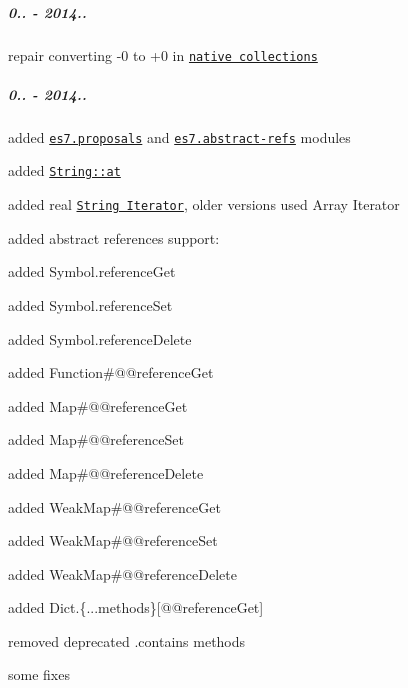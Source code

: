 \subparagraph*{0.. -\/ 2014..}


\begin{DoxyItemize}
\item repair converting -\/0 to +0 in \href{https://github.com/zloirock/core-js/#ecmascript-6-collections}{\tt native collections}
\end{DoxyItemize}

\subparagraph*{0.. -\/ 2014..}


\begin{DoxyItemize}
\item added \href{https://github.com/zloirock/core-js/#ecmascript-7-proposals}{\tt {\ttfamily es7.\+proposals}} and \href{https://github.com/zenparsing/es-abstract-refs}{\tt {\ttfamily es7.\+abstract-\/refs}} modules
\item added \href{https://github.com/zloirock/core-js/#ecmascript-7-proposals}{\tt {\ttfamily String\+::at}}
\item added real \href{https://github.com/zloirock/core-js/#ecmascript-6-iterators}{\tt {\ttfamily String Iterator}}, older versions used Array Iterator
\item added abstract references support\+:
\begin{DoxyItemize}
\item added {\ttfamily Symbol.\+reference\+Get}
\item added {\ttfamily Symbol.\+reference\+Set}
\item added {\ttfamily Symbol.\+reference\+Delete}
\item added {\ttfamily Function\#@@reference\+Get}
\item added {\ttfamily Map\#@@reference\+Get}
\item added {\ttfamily Map\#@@reference\+Set}
\item added {\ttfamily Map\#@@reference\+Delete}
\item added {\ttfamily Weak\+Map\#@@reference\+Get}
\item added {\ttfamily Weak\+Map\#@@reference\+Set}
\item added {\ttfamily Weak\+Map\#@@reference\+Delete}
\item added {\ttfamily Dict.\{...methods\}\mbox{[}@@reference\+Get\mbox{]}}
\end{DoxyItemize}
\item removed deprecated {\ttfamily .contains} methods
\item some fixes
\end{DoxyItemize}

